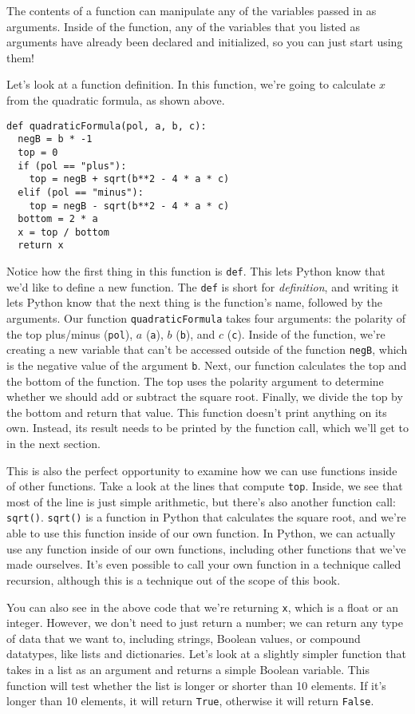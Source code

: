 The contents of a function can manipulate any of the variables passed in as arguments. Inside of the function, any of the variables that you listed as arguments have already been declared and initialized, so you can just start using them!\par
Let's look at a function definition. In this function, we're going to calculate $x$ from the quadratic formula, as shown above.\par
\begin{lstlisting}[style=pippython]
def quadraticFormula(pol, a, b, c):
  negB = b * -1
  top = 0
  if (pol == "plus"):
    top = negB + sqrt(b**2 - 4 * a * c)
  elif (pol == "minus"):
    top = negB - sqrt(b**2 - 4 * a * c)
  bottom = 2 * a
  x = top / bottom
  return x
\end{lstlisting}
Notice how the first thing in this function is \verb|def|. This lets Python know that we'd like to define a new function. The \verb|def| is short for \textit{definition}, and writing it lets Python know that the next thing is the function's name, followed by the arguments. Our function \verb|quadraticFormula| takes four arguments: the polarity of the top plus/minus (\verb|pol|), $a$ (\verb|a|), $b$ (\verb|b|), and $c$ (\verb|c|). Inside of the function, we're creating a new variable that can't be accessed outside of the function \verb|negB|, which is the negative value of the argument \verb|b|. Next, our function calculates the top and the bottom of the function. The top uses the polarity argument to determine whether we should add or subtract the square root. Finally, we divide the top by the bottom and return that value. This function doesn't print anything on its own. Instead, its result needs to be printed by the function call, which we'll get to in the next section.\par
This is also the perfect opportunity to examine how we can use functions inside of other functions. Take a look at the lines that compute \verb|top|. Inside, we see that most of the line is just simple arithmetic, but there's also another function call: \verb|sqrt()|. \verb|sqrt()| is a function in Python that calculates the square root, and we're able to use this function inside of our own function. In Python, we can actually use any function inside of our own functions, including other functions that we've made ourselves. It's even possible to call your own function in a technique called recursion, although this is a technique out of the scope of this book.\par
You can also see in the above code that we're returning \verb|x|, which is a float or an integer. However, we don't need to just return a number; we can return any type of data that we want to, including strings, Boolean values, or compound datatypes, like lists and dictionaries. Let's look at a slightly simpler function that takes in a list as an argument and returns a simple Boolean variable. This function will test whether the list is longer or shorter than 10 elements. If it's longer than 10 elements, it will return \verb|True|, otherwise it will return \verb|False|.
